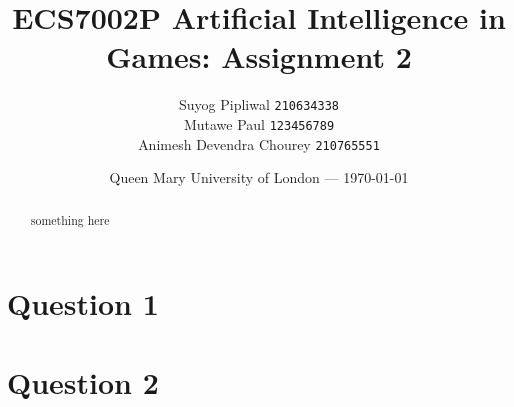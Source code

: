 \documentclass[11pt]{article}
\title{ECS7002P Artificial Intelligence in Games: Assignment 2} %
\author{Suyog Pipliwal \texttt{210634338}\\ 
			Mutawe Paul \texttt{123456789} \\ 
			Animesh Devendra Chourey \texttt{210765551}
} %
\date{Queen Mary University of London --- \today} %
\begin{document}
	\maketitle
\begin{abstract}
	something here
\end{abstract}
\section{Question 1}
\section{Question 2}
\end{document}
